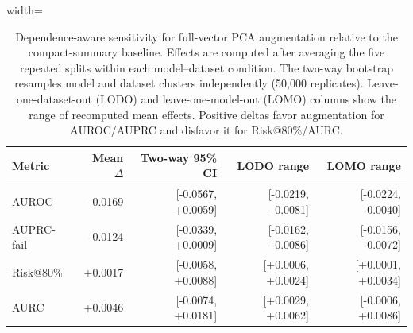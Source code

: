 \begin{table}[t]
\centering
\small
\caption{Dependence-aware sensitivity for full-vector PCA augmentation relative to the compact-summary baseline. Effects are computed after averaging the five repeated splits within each model--dataset condition. The two-way bootstrap resamples model and dataset clusters independently (50,000 replicates). Leave-one-dataset-out (LODO) and leave-one-model-out (LOMO) columns show the range of recomputed mean effects. Positive deltas favor augmentation for AUROC/AUPRC and disfavor it for Risk@80\%/AURC.}
\label{tab:crossed-dependence}
\begin{adjustbox}{width=\textwidth}
\begin{tabular}{lrrrr}
\toprule
Metric & Mean $\Delta$ & Two-way 95\% CI & LODO range & LOMO range \\
\midrule
AUROC & -0.0169 & [-0.0567, +0.0059] & [-0.0219, -0.0081] & [-0.0224, -0.0040] \\
AUPRC-fail & -0.0124 & [-0.0339, +0.0009] & [-0.0162, -0.0086] & [-0.0156, -0.0072] \\
Risk@80\% & +0.0017 & [-0.0058, +0.0088] & [+0.0006, +0.0024] & [+0.0001, +0.0034] \\
AURC & +0.0046 & [-0.0074, +0.0181] & [+0.0029, +0.0062] & [-0.0006, +0.0086] \\
\bottomrule
\end{tabular}
\end{adjustbox}
\end{table}
